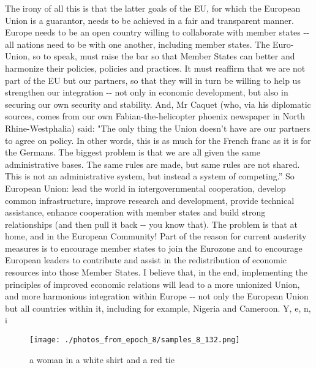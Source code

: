 \documentclass{article}%
\begin{document}
The irony of all this is that the latter goals of the EU, for which the European Union is a guarantor, needs to be achieved in a fair and transparent manner. Europe needs to be an open country willing to collaborate with member states {-}{-} all nations need to be with one another, including member states. The Euro{-}Union, so to speak, must raise the bar so that Member States can better and harmonize their policies, policies and practices. It must reaffirm that we are not part of the EU but our partners, so that they will in turn be willing to help us strengthen our integration {-}{-} not only in economic development, but also in securing our own security and stability.\newline%
And, Mr Caquet (who, via his diplomatic sources, comes from our own Fabian{-}the{-}helicopter phoenix newspaper in North Rhine{-}Westphalia) said: "The only thing the Union doesn't have are our partners to agree on policy. In other words, this is as much for the French franc as it is for the Germans. The biggest problem is that we are all given the same administrative bases. The same rules are made, but same rules are not shared. This is not an administrative system, but instead a system of competing.”\newline%
So European Union: lead the world in intergovernmental cooperation, develop common infrastructure, improve research and development, provide technical assistance, enhance cooperation with member states and build strong relationships (and then pull it back {-}{-} you know that). The problem is that at home, and in the European Community!\newline%
Part of the reason for current austerity measures is to encourage member states to join the Eurozone and to encourage European leaders to contribute and assist in the redistribution of economic resources into those Member States. I believe that, in the end, implementing the principles of improved economic relations will lead to a more unionized Union, and more harmonious integration within Europe {-}{-} not only the European Union but all countries within it, including for example, Nigeria and Cameroon.\newline%
Y, e, n, i\newline%

%


\begin{figure}[h!]%
\centering%
\texttt{[image: ./photos\_from\_epoch\_8/samples\_8\_132.png]}%
\caption{a woman in a white shirt and a red tie}%
\end{figure}

%
\end{document}

